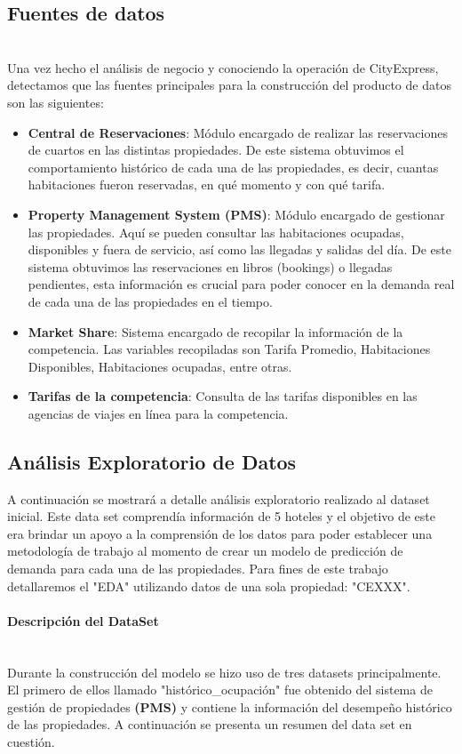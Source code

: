\documentclass{article}\usepackage[]{graphicx}\usepackage[]{color}
\begin{document}
\subsection{Fuentes de datos}
~\\
Una vez hecho el análisis de negocio y conociendo la operación de CityExpress, detectamos que las fuentes principales para la construcción del producto de datos son las siguientes:
\begin{itemize}
\item \textbf{Central de Reservaciones}: Módulo encargado de realizar las reservaciones de cuartos en las distintas propiedades. De este sistema obtuvimos el comportamiento histórico de cada una de las propiedades, es decir, cuantas habitaciones fueron reservadas, en qué momento y con qué tarifa.
\item \textbf{Property Management System (PMS)}: Módulo encargado de gestionar las propiedades. Aquí se pueden consultar las habitaciones ocupadas, disponibles y fuera de servicio, así como las llegadas y salidas del día. De este sistema obtuvimos las reservaciones en libros (bookings) o llegadas pendientes, esta información es crucial para poder conocer en la demanda real de cada una de las propiedades en el tiempo.
\item \textbf{Market Share}: Sistema encargado de recopilar la información de la competencia. Las variables recopiladas son Tarifa Promedio, Habitaciones Disponibles, Habitaciones ocupadas, entre otras. 
\item \textbf{Tarifas de la competencia}: Consulta de las tarifas disponibles en las agencias de viajes en línea para la competencia.
\end{itemize}
\subsection{Análisis Exploratorio de Datos}
A continuación se mostrará a detalle análisis exploratorio realizado al dataset inicial. Este data set comprendía información de 5 hoteles y el objetivo de este era brindar un apoyo a la comprensión de los datos para poder establecer una metodología de trabajo al momento de crear un modelo de predicción de demanda para cada una de las propiedades. Para fines de este trabajo detallaremos el "EDA" utilizando datos de una sola propiedad: "CEXXX".
\paragraph{Descripción del DataSet} ~\\
Durante la construcción del modelo se hizo uso de tres datasets principalmente. El primero de ellos llamado "histórico\_ocupación" fue obtenido del sistema de gestión de propiedades \textbf{(PMS)} y contiene la información del desempeño histórico de las propiedades. A continuación se presenta un resumen del data set en cuestión.
\end{document}
